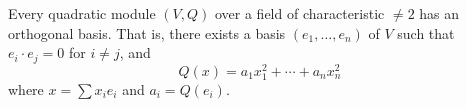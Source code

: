 Every quadratic module $(V, Q)$ over a field of characteristic $\neq 2$ has an orthogonal basis. That is, there exists a basis $(e_1, \ldots, e_n)$ of $V$ such that $e_i \cdot e_j = 0$ for $i \neq j$, and
$$Q(x) = a_1 x_1^2 + \cdots + a_n x_n^2$$
where $x = \sum x_i e_i$ and $a_i = Q(e_i)$.
